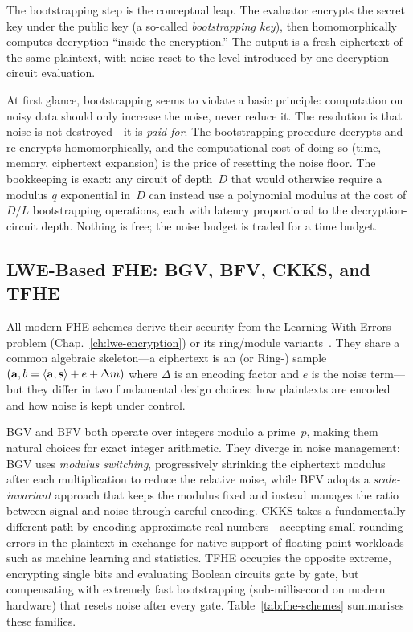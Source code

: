 The bootstrapping step is the conceptual leap.  The evaluator encrypts the secret key under the public key (a so-called \emph{bootstrapping key}), then homomorphically computes decryption ``inside the encryption.''  The output is a fresh ciphertext of the same plaintext, with noise reset to the level introduced by one decryption-circuit evaluation.

At first glance, bootstrapping seems to violate a basic principle: computation on noisy data should only increase the noise, never reduce it.  The resolution is that noise is not destroyed---it is \emph{paid for}.  The bootstrapping procedure decrypts and re-encrypts homomorphically, and the computational cost of doing so (time, memory, ciphertext expansion) is the price of resetting the noise floor.  The bookkeeping is exact: any circuit of depth~$D$ that would otherwise require a modulus $q$ exponential in~$D$ can instead use a polynomial modulus at the cost of $D/L$ bootstrapping operations, each with latency proportional to the decryption-circuit depth.  Nothing is free; the noise budget is traded for a time budget.


\subsection{LWE-Based FHE: BGV, BFV, CKKS, and TFHE}
\label{subsec:fhe-schemes}

All modern FHE schemes derive their security from the Learning With Errors problem (Chap.~\ref{ch:lwe-encryption}) or its ring/module variants~\cite{Regev2009}.  They share a common algebraic skeleton---a ciphertext is an \lwe{} (or Ring-\lwe{}) sample $(\mathbf{a}, b = \left\langle \mathbf{a}, \mathbf{s} \right\rangle + e + \Delta m)$ where $\Delta$ is an encoding factor and $e$ is the noise term---but they differ in two fundamental design choices: how plaintexts are encoded and how noise is kept under control.

BGV and BFV both operate over integers modulo a prime~$p$, making them natural choices for exact integer arithmetic.  They diverge in noise management: BGV uses \emph{modulus switching}, progressively shrinking the ciphertext modulus after each multiplication to reduce the relative noise, while BFV adopts a \emph{scale-invariant} approach that keeps the modulus fixed and instead manages the ratio between signal and noise through careful encoding.  CKKS takes a fundamentally different path by encoding approximate real numbers---accepting small rounding errors in the plaintext in exchange for native support of floating-point workloads such as machine learning and statistics.  TFHE occupies the opposite extreme, encrypting single bits and evaluating Boolean circuits gate by gate, but compensating with extremely fast bootstrapping (sub-millisecond on modern hardware) that resets noise after every gate.  Table~\ref{tab:fhe-schemes} summarises these families.


